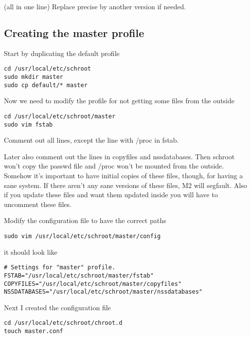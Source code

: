 \documentclass[a4paper]{book}
\begin{document}
(all in one line)
Replace precise by another version if needed.


\subsection{Creating the master profile}

Start by duplicating the default profile

\begin{verbatim}
cd /usr/local/etc/schroot
sudo mkdir master
sudo cp default/* master
\end{verbatim}

Now we need to modify the profile for not getting some files from the outside

\begin{verbatim}
cd /usr/local/etc/schroot/master
sudo vim fstab
\end{verbatim}

Comment out all lines, except the line with /proc in fstab. 

Later also comment out the lines in copyfiles and nssdatabases.  Then schroot
won't copy the passwd file and /proc won't be mounted from the outside.
Somehow it's important to have initial copies of these files, though, for
having a sane system. If there aren't any sane versions of these files, M2 will
segfault.  Also if you update these files and want them updated inside you will
have to uncomment these files.

Modify the configuration file to have the correct paths

\begin{verbatim}
sudo vim /usr/local/etc/schroot/master/config
\end{verbatim}

it should look like

\begin{verbatim}
# Settings for "master" profile.
FSTAB="/usr/local/etc/schroot/master/fstab"
COPYFILES="/usr/local/etc/schroot/master/copyfiles"
NSSDATABASES="/usr/local/etc/schroot/master/nssdatabases"
\end{verbatim}

Next I created the configuration file

\begin{verbatim}
cd /usr/local/etc/schroot/chroot.d
touch master.conf
\end{verbatim}
\end{document}
